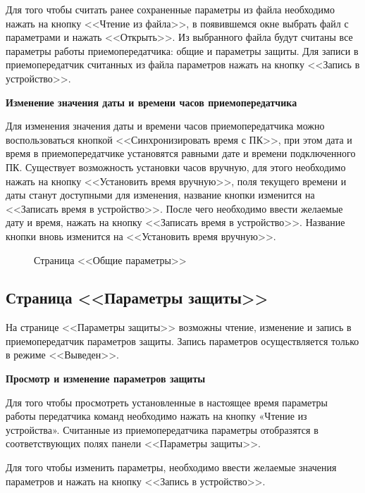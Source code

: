 Для того чтобы считать ранее сохраненные параметры из файла необходимо нажать на кнопку <<Чтение из файла>>, в появившемся окне выбрать файл с параметрами и нажать <<Открыть>>. Из выбранного файла будут считаны все параметры работы приемопередатчика: общие и параметры защиты. Для записи в приемопередатчик считанных из файла параметров нажать на кнопку <<Запись в устройство>>.
\newline

\textbf{Изменение значения даты и времени часов приемопередатчика}

Для изменения значения даты и времени часов приемопередатчика можно воспользоваться кнопкой <<Синхронизировать время с ПК>>, при этом дата и время в приемопередатчике установятся равными дате и времени подключенного ПК. Существует возможность установки часов вручную, для этого необходимо нажать на кнопку <<Установить время вручную>>, поля текущего времени и даты станут доступными для изменения, название кнопки изменится на <<Записать время в устройство>>. После чего необходимо ввести желаемые дату и время, нажать на кнопку <<Записать время в устройство>>. Название кнопки вновь изменится на <<Установить время вручную>>. 

\begin{figure}[H]
	
	\caption{Страница <<Общие параметры>>}
	\label{fig:configurator_param_glb}
\end{figure}


\subsection{Страница <<Параметры защиты>>}	\label{ssec:configurator_param_def}

На странице <<Параметры защиты>> возможны чтение, изменение и запись в приемопередатчик параметров защиты. Запись параметров осуществляется только в режиме <<Выведен>>.
\newline 

\textbf{Просмотр и изменение параметров защиты}

Для того чтобы просмотреть установленные в настоящее время параметры работы передатчика команд необходимо нажать на кнопку «Чтение из устройства». Считанные из приемопередатчика параметры отобразятся в соответствующих полях панели <<Параметры защиты>>.

Для того чтобы изменить параметры, необходимо ввести желаемые значения параметров и нажать на кнопку <<Запись в устройство>>. 
\newline 

